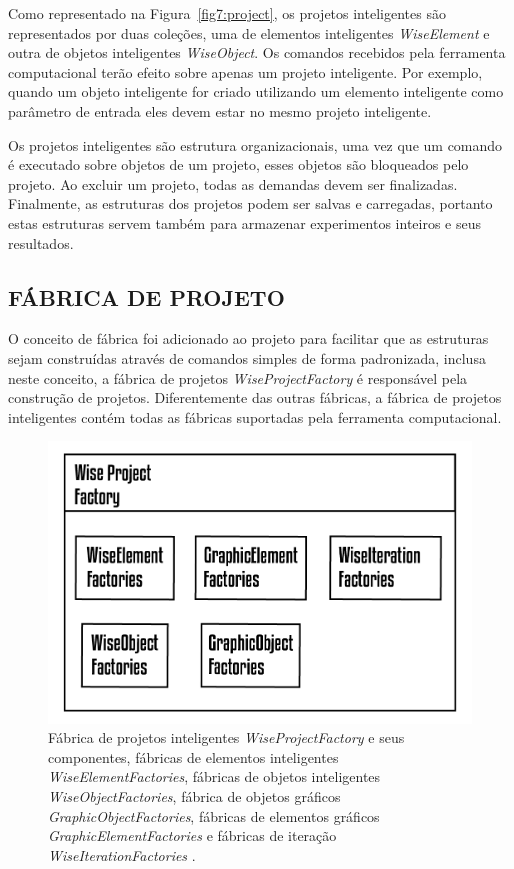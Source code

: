 \documentclass[a4paper,12pt]{monografia}
\theoremstyle{plain}
\theoremstyle{definition}
\theoremstyle{remark}
\begin{document}
Como representado na Figura~\ref{fig7:project}, os projetos inteligentes são representados por duas coleções, uma de elementos inteligentes \textit{WiseElement} e outra de objetos inteligentes \textit{WiseObject}. Os comandos recebidos pela ferramenta computacional terão efeito sobre apenas um projeto inteligente. Por exemplo, quando um objeto inteligente for criado utilizando um elemento inteligente como parâmetro de entrada eles devem estar no mesmo projeto inteligente.

Os projetos inteligentes são estrutura organizacionais, uma vez que um comando é executado sobre objetos de um projeto, esses objetos são bloqueados pelo projeto. Ao excluir um projeto, todas as demandas devem ser finalizadas. Finalmente, as estruturas dos projetos podem ser salvas e carregadas, portanto estas estruturas servem também para armazenar experimentos inteiros e seus resultados.

\subsection{FÁBRICA DE PROJETO}\label{sec:fabrica_projeto} 

O conceito de fábrica foi adicionado ao projeto para facilitar que as estruturas sejam construídas através de comandos simples de forma padronizada, inclusa neste conceito, a fábrica de projetos \textit{WiseProjectFactory} é responsável pela construção de projetos. Diferentemente das outras fábricas, a fábrica de projetos inteligentes contém todas as fábricas suportadas pela ferramenta computacional.

\begin{figure}[!htbp]
	\centering
	\includegraphics[scale=1]{Figures/WiseProjectFactory.png}
	\caption{Fábrica de projetos inteligentes \textit{WiseProjectFactory} e seus componentes, fábricas de elementos inteligentes \textit{WiseElementFactories}, fábricas de objetos inteligentes \textit{WiseObjectFactories}, fábrica de objetos gráficos \textit{GraphicObjectFactories}, fábricas de elementos gráficos \textit{GraphicElementFactories} e fábricas de iteração \textit{WiseIterationFactories} .}
	\label{fig7:projectfactory}
\end{figure}
\end{document}
